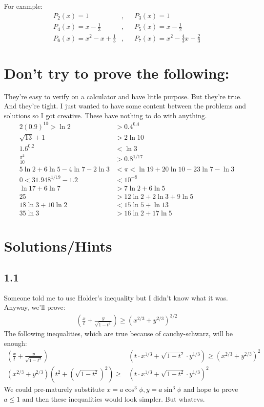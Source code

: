 \documentclass{article}
\begin{document}
For example:
\begin{align*}
    P_2(x) = 1 &,&& P_3(x) = 1 \\
    P_4(x) = x-\frac{1}{3} &,&& P_5(x) = x-\frac{1}{2} \\
    P_6(x) = x^2-x+\frac{1}{3} &,&& P_7(x) = x^2-\frac{4}{3}x+\frac{2}{3}
\end{align*}

\section*{Don't try to prove the following:}
They're easy to verify on a calculator and have little purpose. But they're true. And they're tight. I just wanted to have some content between the problems and solutions so I got creative. These have nothing to do with anything.
\begin{align}
    2(0.9)^{10} > \ln2 &> 0.4^{0.4} \\
    \sqrt{13}+1 &> 2\ln 10 \\
    1.6^{0.2} &< \ln3 \\
    \frac{\pi^2}{10} &> 0.8^{1/17} \\
    5 \ln 2 + 6 \ln 5 -4 \ln 7 - 2 \ln 3 &< \pi < \ln 19 + 20 \ln 10 -23 \ln 7 - \ln 3 \\
    0<31.948^{1/19} - 1.2 &< 10^{-9} \\
    \ln17 + 6\ln 7 &> 7\ln2 + 6\ln 5 \\
    25 &> 12\ln2 + 2\ln3 + 9\ln5 \\
    18\ln3 + 10\ln2 &< 15\ln5+\ln13 \\
    35\ln3 &> 16\ln2+17\ln5 
\end{align}

\section*{Solutions/Hints}
\subsection*{1.1}
Someone told me to use Holder's inequality but I didn't know what it was. Anyway, we'll prove:
\begin{align*}
    \left(\frac{x}{t} + \frac{y}{\sqrt{1-t^2}}\right) \geq \left(x^{2/3} + y^{2/3}\right)^{3/2}
\end{align*}
The following inequalities, which are true because of cauchy-schwarz, will be enough:
\begin{align*}
    \left(\frac{x}{t} + \frac{y}{\sqrt{1-t^2}}\right)&\left(t\cdot x^{1/3} + \sqrt{1-t^2} \cdot y^{1/3}\right) \geq \left(x^{2/3} + y^{2/3}\right)^{2} \\
    \left(x^{2/3} + y^{2/3}\right)\left(t^2 + (\sqrt{1-t^2})^2\right) \geq &\left(t\cdot x^{1/3} + \sqrt{1-t^2} \cdot y^{1/3}\right)^2
\end{align*}
We could pre-maturely substitute $x=a\cos^3\phi, y=a\sin^3\phi$ and hope to prove $a\leq 1$ and then these inequalities would look simpler. But whatevs.
\end{document}
